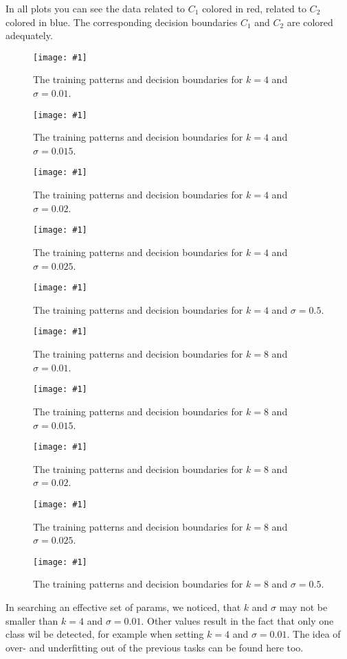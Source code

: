 \documentclass[a4paper,headings=small]{scrartcl}
\newcommand{\image}[3]{
\begin{figure}[htbp]
\centering
\texttt{[image: \#1]}
\caption{#3}
\label{fig:#1}
\end{figure}
}
\begin{document}
In all plots you can see the data related to $C_1$ colored in red, related to $C_2$ colored in blue.
The corresponding decision boundaries $C_1$ and $C_2$ are colored adequately.

\image{out_classifierRbf_k_4_sigma_001}{0.8}%
	{The training patterns and decision boundaries for $k = 4$ and $\sigma = 0.01$.}

\image{out_classifierRbf_k_4_sigma_0015}{0.8}%
	{The training patterns and decision boundaries for $k = 4$ and $\sigma = 0.015$.}

\image{out_classifierRbf_k_4_sigma_002}{0.8}%
	{The training patterns and decision boundaries for $k = 4$ and $\sigma = 0.02$.}

\image{out_classifierRbf_k_4_sigma_0025}{0.8}%
	{The training patterns and decision boundaries for $k = 4$ and $\sigma = 0.025$.}

\image{out_classifierRbf_k_4_sigma_05}{0.8}%
	{The training patterns and decision boundaries for $k = 4$ and $\sigma = 0.5$.}

\image{out_classifierRbf_k_8_sigma_001}{0.8}%
	{The training patterns and decision boundaries for $k = 8$ and $\sigma = 0.01$.}

\image{out_classifierRbf_k_8_sigma_0015}{0.8}%
	{The training patterns and decision boundaries for $k = 8$ and $\sigma = 0.015$.}

\image{out_classifierRbf_k_8_sigma_002}{0.8}%
	{The training patterns and decision boundaries for $k = 8$ and $\sigma = 0.02$.}

\image{out_classifierRbf_k_8_sigma_0025}{0.8}%
	{The training patterns and decision boundaries for $k = 8$ and $\sigma = 0.025$.}

\image{out_classifierRbf_k_8_sigma_05}{0.8}%
	{The training patterns and decision boundaries for $k = 8$ and $\sigma = 0.5$.}


In searching an effective set of params, we noticed, that $k$ and $\sigma$ may not be smaller than $k=4$ and $\sigma = 0.01$.
Other values result in the fact that only one class wil be detected,
for example when setting $k = 4$ and $\sigma = 0.01$.
The idea of over- and underfitting out of the previous tasks can be found here too.
\end{document}
